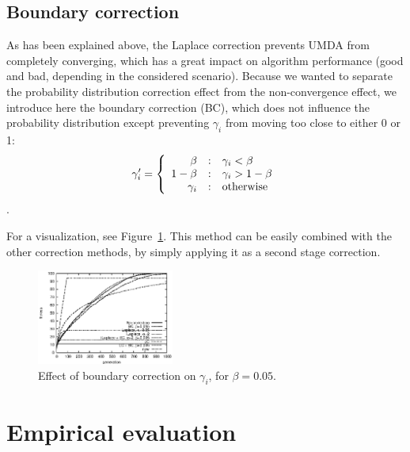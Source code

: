 \documentclass{acm_proc_article-sp}
\newcommand{\p}{\gamma}
\begin{document}
\subsection{Boundary correction}
\label{sec:bc}

As has been explained above, the Laplace correction prevents UMDA from completely
converging, which has a great impact on algorithm performance (good and bad, depending
in the considered scenario). Because we wanted to separate the probability distribution
correction effect from the non-convergence effect, we introduce here the boundary
correction (BC), which does not influence the probability distribution except preventing
$\p_i$ from moving too close to either 0 or 1:
\begin{eqnarray}
\p'_i=\left\{\begin{array}{r@{\quad:\quad}l}
\beta & \p_i < \beta\\
1-\beta & \p_i > 1-\beta\\
\p_i & \mbox{otherwise}
\end{array}\right.
\end{eqnarray}.

For a visualization, see Figure~\ref{fig:bc}.
This method can be easily combined with the other correction methods, by simply
applying it as a second stage correction.

\begin{figure}
\centerline{
\includegraphics[width=0.4\textwidth]{graph_leading1169910391/graph_leading000_fitness.eps}}
\caption{Effect of boundary correction on $\p_i$, for $\beta=0.05$.\label{fig:bc}}
\end{figure}



\section{Empirical evaluation}
\label{sec:results}
\end{document}
